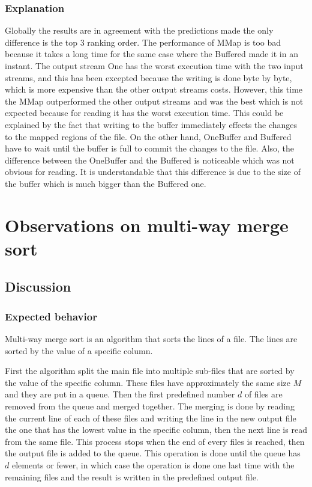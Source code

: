 \documentclass[12pt]{article}
\begin{document}
\subsubsection{Explanation}
Globally the results are in agreement with the predictions made the only difference is the top 3 ranking order. The performance of MMap is too bad because it takes a long time for the same case where the Buffered made it in an instant. The output stream One has the worst execution time with the two input streams, and this has been excepted because the writing is done byte by byte, which is more expensive than the other output streams costs. However, this time the MMap outperformed the other output streams and was the best which is not expected because for reading it has the worst execution time. This could be explained by the fact that writing to the buffer immediately effects the changes to the mapped regions of the file. On the other hand, OneBuffer and Buffered have to wait until the buffer is full to commit the changes to the file. Also, the difference between the OneBuffer and the Buffered is noticeable which was not obvious for reading. It is understandable that this difference is due to the size of the buffer which is much bigger than the Buffered one.

\section{Observations on multi-way merge sort}

\subsection{Discussion}

\subsubsection{Expected behavior}
Multi-way merge sort is an algorithm that sorts the lines of a file. The lines are sorted by the value of a specific column.

First the algorithm split the main file into multiple sub-files that are sorted by the value of the specific column. These files have approximately the same size $M$ and they are put in a queue. Then the first predefined number $d$ of files are removed from the queue and merged together. The merging is done by reading the current line of each of these files and writing the line in the new output file the one that has the lowest value in the specific column, then the next line is read from the same file. This process stops when the end of every files is reached, then the output file is added to the queue. This operation is done until the queue has $d$ elements or fewer, in which case the operation is done one last time with the remaining files and the result is written in the predefined output file.
\end{document}

